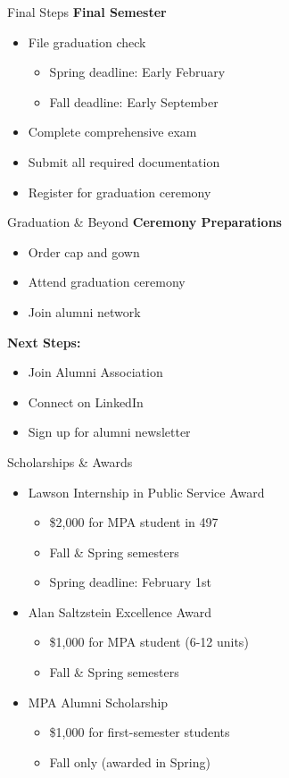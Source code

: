 \documentclass[10pt]{beamer}
\begin{document}
    \begin{frame}{Final Steps}
    \textbf{Final Semester}
    \begin{itemize}
    \item File graduation check
        \begin{itemize}
        \item Spring deadline: Early February
        \item Fall deadline: Early September
        \end{itemize}
    \item Complete comprehensive exam
    \item Submit all required documentation
    \item Register for graduation ceremony
    \end{itemize}
    \end{frame}
    
    \begin{frame}{Graduation \& Beyond}
    \textbf{Ceremony Preparations}
    \begin{itemize}
    \item Order cap and gown
    \item Attend graduation ceremony
    \item Join alumni network
    \end{itemize}
    
    \textbf{Next Steps:}
    \begin{itemize}
    \item Join Alumni Association
    \item Connect on LinkedIn
    \item Sign up for alumni newsletter
    \end{itemize}
    \end{frame}

\begin{frame}{Scholarships \& Awards}
\begin{itemize}
\item Lawson Internship in Public Service Award
    \begin{itemize}
    \item \$2,000 for MPA student in 497
    \item Fall \& Spring semesters
    \item Spring deadline: February 1st
    \end{itemize}
\item Alan Saltzstein Excellence Award
    \begin{itemize}
    \item \$1,000 for MPA student (6-12 units)
    \item Fall \& Spring semesters
    \end{itemize}
\item MPA Alumni Scholarship
    \begin{itemize}
    \item \$1,000 for first-semester students
    \item Fall only (awarded in Spring)
    \end{itemize}
\end{itemize}
\end{frame}
\end{document}
